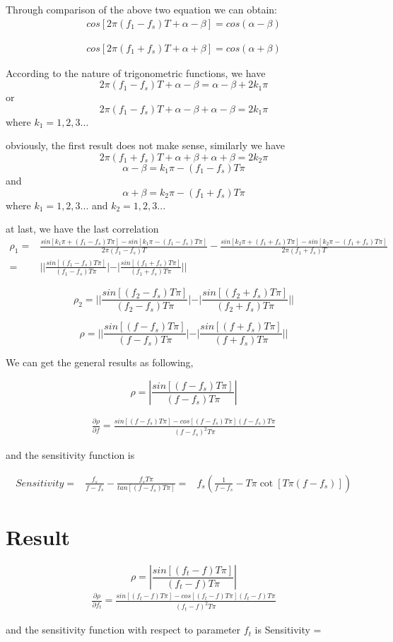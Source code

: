 \documentclass{article}
\begin{document}
Through comparison of the above two equation we can obtain:
\begin{align*}
    cos[2\pi (f_1 - f_s)T + \alpha - \beta] = cos(\alpha - \beta)
\end{align*}

\begin{align*}
    cos[2\pi (f_1 + f_s)T + \alpha + \beta] = cos(\alpha + \beta)
\end{align*}

According to the nature of trigonometric functions, we have
$$2\pi (f_1 - f_s)T + \alpha - \beta = \alpha - \beta + 2k_1\pi$$
or
$$2\pi (f_1 - f_s)T + \alpha - \beta + \alpha - \beta = 2k_1\pi$$
where $k_1 = 1,2,3...$

obviously, the first result does not make sense,
similarly we have
$$2\pi (f_1 + f_s)T + \alpha + \beta + \alpha + \beta = 2k_2\pi$$
$$\alpha - \beta = k_1\pi - (f_1 - f_s)T\pi$$
and
$$\alpha + \beta = k_2\pi - (f_1 + f_s)T\pi$$
where $k_1 = 1,2,3...$ and $k_2 = 1,2,3...$

at last, we have the last correlation
\begin{align*}
\rho_1  =& \frac{sin[k_1\pi + (f_1 - f_s)T\pi] - sin[k_1\pi - (f_1 - f_s)T\pi]}{2\pi (f_1 - f_s)T} - \frac{sin[k_2\pi + (f_1 + f_s)T\pi] - sin[k_2\pi - (f_1 + f_s)T\pi]}{2\pi (f_1 + f_s)T} \nonumber \\
        =& ||\frac{sin[(f_1 - f_s)T\pi]}{(f_1 - f_s)T\pi}| - |\frac{sin[(f_1 + f_s)T\pi]}{(f_1 + f_s)T\pi}|| \nonumber
\end{align*}

$$\rho_2 = ||\frac{sin[(f_2 - f_s)T\pi]}{(f_2 - f_s)T\pi}| - |\frac{sin[(f_2 + f_s)T\pi]}{(f_2 + f_s)T\pi}||$$

$$\rho = ||\frac{sin[(f - f_s)T\pi]}{(f - f_s)T\pi}| - |\frac{sin[(f + f_s)T\pi]}{(f + f_s)T\pi}||$$

We can get the general results as following,

$$\rho = |\frac{sin[(f - f_s)T\pi]}{(f - f_s)T\pi}|$$


\begin{align*}
\frac{\partial \rho}{\partial f} = \frac{sin[(f - f_s)T\pi] - cos[(f - f_s)T\pi](f - f_s)T\pi}{{(f - f_s)^2}T\pi}
\end{align*}

and the sensitivity function is

\begin{align*}
Sensitivity =& \frac{f_s}{f - f_s} - \frac{f_s T \pi}{tan[(f - f_s)T\pi]}   \nonumber
            =& f_s \left (\frac{1}{f - f_s} - T \pi  \cot [T \pi (f - f_s)]\right )
\end{align*}


\section{Result}
$$\rho = |\frac{sin[(f_t - f)T\pi]}{(f_t - f)T\pi}|$$
\begin{align*}
\frac{\partial \rho}{\partial f_t} = \frac{sin[(f_t - f)T\pi] - cos[(f_t - f)T\pi](f_t - f)T\pi}{{(f_t - f)^2}T\pi}
\end{align*}

and the sensitivity function with respect to parameter $f_t$ is
Sensitivity =
\end{document}
